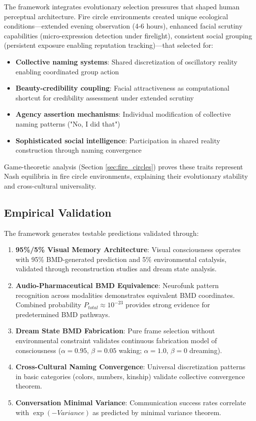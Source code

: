 \documentclass[12pt]{article}
\theoremstyle{definition}
\theoremstyle{remark}
\begin{document}
The framework integrates evolutionary selection pressures that shaped human perceptual architecture. Fire circle environments created unique ecological conditions—extended evening observation (4-6 hours), enhanced facial scrutiny capabilities (micro-expression detection under firelight), consistent social grouping (persistent exposure enabling reputation tracking)—that selected for:

\begin{itemize}
\item \textbf{Collective naming systems}: Shared discretization of oscillatory reality enabling coordinated group action
\item \textbf{Beauty-credibility coupling}: Facial attractiveness as computational shortcut for credibility assessment under extended scrutiny
\item \textbf{Agency assertion mechanisms}: Individual modification of collective naming patterns ("No, I did that")
\item \textbf{Sophisticated social intelligence}: Participation in shared reality construction through naming convergence
\end{itemize}

Game-theoretic analysis (Section \ref{sec:fire_circles}) proves these traits represent Nash equilibria in fire circle environments, explaining their evolutionary stability and cross-cultural universality.

\subsection{Empirical Validation}

The framework generates testable predictions validated through:

\begin{enumerate}
\item \textbf{95\%/5\% Visual Memory Architecture}: Visual consciousness operates with 95\% BMD-generated prediction and 5\% environmental catalysis, validated through reconstruction studies and dream state analysis.

\item \textbf{Audio-Pharmaceutical BMD Equivalence}: Neurofunk pattern recognition across modalities demonstrates equivalent BMD coordinates. Combined probability $P_{total} \approx 10^{-23}$ provides strong evidence for predetermined BMD pathways.

\item \textbf{Dream State BMD Fabrication}: Pure frame selection without environmental constraint validates continuous fabrication model of consciousness ($\alpha = 0.95$, $\beta = 0.05$ waking; $\alpha = 1.0$, $\beta = 0$ dreaming).

\item \textbf{Cross-Cultural Naming Convergence}: Universal discretization patterns in basic categories (colors, numbers, kinship) validate collective convergence theorem.

\item \textbf{Conversation Minimal Variance}: Communication success rates correlate with $\exp(-Variance)$ as predicted by minimal variance theorem.
\end{enumerate}
\end{document}
